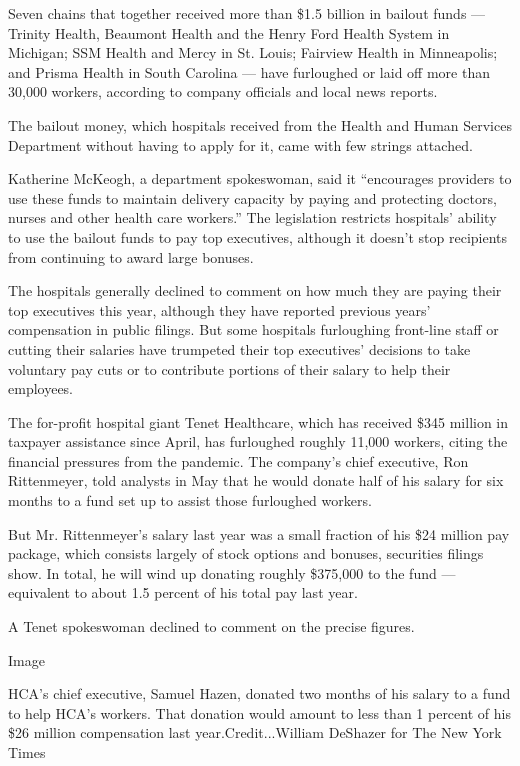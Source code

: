 Seven chains that together received more than \$1.5 billion in bailout
funds --- Trinity Health, Beaumont Health and the Henry Ford Health
System in Michigan; SSM Health and Mercy in St. Louis; Fairview Health
in Minneapolis; and Prisma Health in South Carolina --- have furloughed
or laid off more than 30,000 workers, according to company officials and
local news reports.

The bailout money, which hospitals received from the Health and Human
Services Department without having to apply for it, came with few
strings attached.

Katherine McKeogh, a department spokeswoman, said it ``encourages
providers to use these funds to maintain delivery capacity by paying and
protecting doctors, nurses and other health care workers.'' The
legislation restricts hospitals' ability to use the bailout funds to pay
top executives, although it doesn't stop recipients from continuing to
award large bonuses.

The hospitals generally declined to comment on how much they are paying
their top executives this year, although they have reported previous
years' compensation in public filings. But some hospitals furloughing
front-line staff or cutting their salaries have trumpeted their top
executives' decisions to take voluntary pay cuts or to contribute
portions of their salary to help their employees.

The for-profit hospital giant Tenet Healthcare, which has received \$345
million in taxpayer assistance since April, has furloughed roughly
11,000 workers, citing the financial pressures from the pandemic. The
company's chief executive, Ron Rittenmeyer, told analysts in May that he
would donate half of his salary for six months to a fund set up to
assist those furloughed workers.

But Mr. Rittenmeyer's salary last year was a small fraction of his \$24
million pay package, which consists largely of stock options and
bonuses, securities filings show. In total, he will wind up donating
roughly \$375,000 to the fund --- equivalent to about 1.5 percent of his
total pay last year.

A Tenet spokeswoman declined to comment on the precise figures.

Image

HCA's chief executive, Samuel Hazen, donated two months of his salary to
a fund to help HCA's workers. That donation would amount to less than 1
percent of his \$26 million compensation last year.Credit...William
DeShazer for The New York Times

